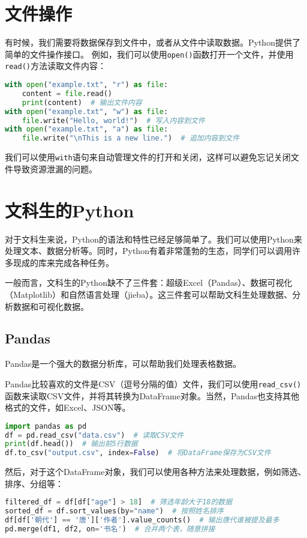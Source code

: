 \documentclass[../main.tex]{subfiles}
\begin{document}
\section{文件操作}

有时候，我们需要将数据保存到文件中，或者从文件中读取数据。Python提供了简单的文件操作接口。
例如，我们可以使用\texttt{open()}函数打开一个文件，并使用\texttt{read()}方法读取文件内容：
\begin{lstlisting}[language=python]
with open("example.txt", "r") as file:
    content = file.read()
    print(content)  # 输出文件内容
with open("example.txt", "w") as file:
    file.write("Hello, world!")  # 写入内容到文件
with open("example.txt", "a") as file:
    file.write("\nThis is a new line.")  # 追加内容到文件
\end{lstlisting}

我们可以使用\texttt{with}语句来自动管理文件的打开和关闭，这样可以避免忘记关闭文件导致资源泄漏的问题。

\section{文科生的Python}

对于文科生来说，Python的语法和特性已经足够简单了。我们可以使用Python来处理文本、数据分析等。同时，Python有着非常蓬勃的生态，同学们可以调用许多现成的库来完成各种任务。

一般而言，文科生的Python缺不了三件套：超级Excel（Pandas）、数据可视化（Matplotlib）和自然语言处理（jieba）。这三件套可以帮助文科生处理数据、分析数据和可视化数据。

\subsection{Pandas}

Pandas是一个强大的数据分析库，可以帮助我们处理表格数据。

Pandas比较喜欢的文件是CSV（逗号分隔的值）文件，我们可以使用\texttt{read\_csv()}函数来读取CSV文件，并将其转换为DataFrame对象。当然，Pandas也支持其他格式的文件，如Excel、JSON等。

\begin{lstlisting}[language=python]
import pandas as pd
df = pd.read_csv("data.csv")  # 读取CSV文件
print(df.head())  # 输出前5行数据
df.to_csv("output.csv", index=False)  # 将DataFrame保存为CSV文件
\end{lstlisting}

然后，对于这个DataFrame对象，我们可以使用各种方法来处理数据，例如筛选、排序、分组等：
\begin{lstlisting}[language=python]
filtered_df = df[df["age"] > 18]  # 筛选年龄大于18的数据
sorted_df = df.sort_values(by="name")  # 按照姓名排序
df[df['朝代'] == '唐']['作者'].value_counts()  # 输出唐代谁被提及最多
pd.merge(df1, df2, on='书名')  # 合并两个表，随意拼接
\end{lstlisting}
\end{document}
